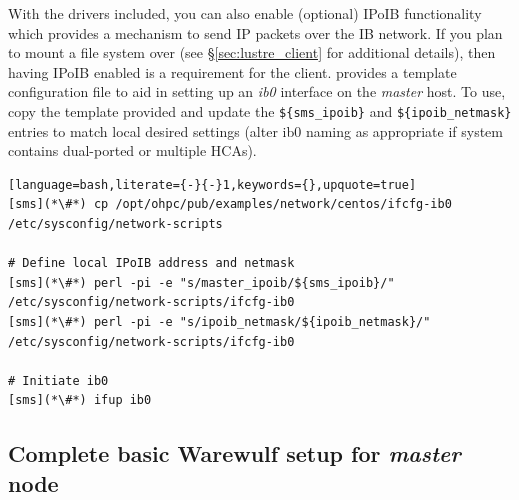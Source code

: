 \documentclass[letterpaper]{article}
\begin{document}
With the \InfiniBand{} drivers included, you can also enable (optional) IPoIB functionality
which provides a mechanism to send IP packets over the IB network. If you plan
to mount a \Lustre{} file system over \InfiniBand{} (see \S\ref{sec:lustre_client}
for additional details), then having IPoIB enabled is a requirement for the
\Lustre{} client. \OHPC{} provides a template configuration file to aid in setting up
an {\em ib0} interface on the {\em master} host. To use, copy the template
provided and update the \texttt{\$\{sms\_ipoib\}} and
\texttt{\$\{ipoib\_netmask\}} entries to match local desired settings (alter ib0
naming as appropriate if system contains dual-ported or multiple HCAs). 

\begin{lstlisting}[language=bash,literate={-}{-}1,keywords={},upquote=true]
[sms](*\#*) cp /opt/ohpc/pub/examples/network/centos/ifcfg-ib0 /etc/sysconfig/network-scripts

# Define local IPoIB address and netmask
[sms](*\#*) perl -pi -e "s/master_ipoib/${sms_ipoib}/" /etc/sysconfig/network-scripts/ifcfg-ib0
[sms](*\#*) perl -pi -e "s/ipoib_netmask/${ipoib_netmask}/" /etc/sysconfig/network-scripts/ifcfg-ib0

# Initiate ib0
[sms](*\#*) ifup ib0
\end{lstlisting}

\vspace*{-0.15cm}
\subsection{Complete basic Warewulf setup for {\em master} node} \label{sec:setup_ww}


\end{document}
